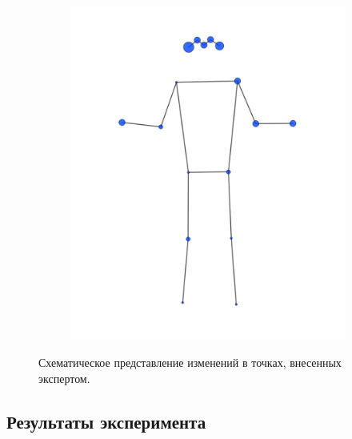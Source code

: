 \begin{figure}[h]
\begin{subfigure}[b]{0.4\textwidth}
	\includegraphics[width=\textwidth]{./images/experiment/data_info/pose_markup_examples/big_change_percentage}
	\caption{}
	\label{fig:big_correction}
\end{subfigure}
\caption{Схематическое представление изменений в точках, внесенных экспертом.}
\label{fig:correction_heatmap}
\end{figure}

\subsection{Результаты эксперимента}





